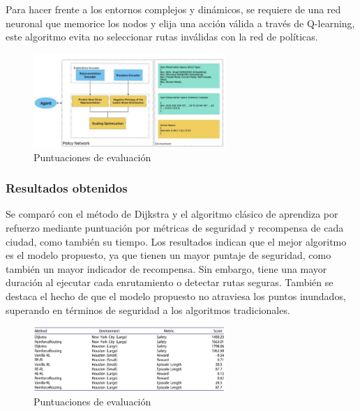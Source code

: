 Para hacer frente a los entornos complejos y dinámicos, se requiere de una red neuronal que memorice los nodos y elija una acción válida a través de Q-learning, este algoritmo evita no seleccionar rutas inválidas con la red de políticas.

\begin{figure}[h]
	\begin{center}
		\includegraphics[width=0.65\textwidth]{2/figures/politica.jpg}
		\caption{Puntuaciones de evaluación}
		\label{1:fig2}
	\end{center}
\end{figure}

\subsubsection{Resultados obtenidos}
Se comparó con el método de Dijkstra y el algoritmo clásico de aprendiza por refuerzo mediante puntuación por métricas de seguridad y recompensa de cada ciudad, como también su tiempo. Los resultados indican que el mejor algoritmo es el modelo propuesto, ya que tienen un mayor puntaje de seguridad, como también un mayor indicador de recompensa. Sin embargo, tiene una mayor duración al ejecutar cada enrutamiento o detectar rutas seguras. También se destaca el hecho de que el modelo propuesto no atraviesa los puntos inundados, superando en términos de seguridad a los algoritmos tradicionales.

\begin{figure}[h]
	\begin{center}
		\includegraphics[width=0.65\textwidth]{2/figures/resultN.jpg}
		\caption{Puntuaciones de evaluación}
		\label{1:fig2}
	\end{center}
\end{figure}


